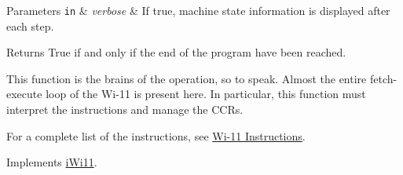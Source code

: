 \begin{DoxyParams}[1]{Parameters}
\mbox{\tt in}  & {\em verbose} & If true, machine state information is displayed after each step. \\
\hline
\end{DoxyParams}
\begin{DoxyReturn}{Returns}
True if and only if the end of the program have been reached.
\end{DoxyReturn}
\begin{DoxyParagraph}{}
This function is the brains of the operation, so to speak. Almost the entire fetch-\/execute loop of the Wi-\/11 is present here. In particular, this function must interpret the instructions and manage the CCRs. 
\end{DoxyParagraph}
\begin{DoxyParagraph}{}
For a complete list of the instructions, see \hyperlink{index_instructions}{Wi-\/11 Instructions}. 
\end{DoxyParagraph}


Implements \hyperlink{classiWi11_ae502d86eb25fe6e1169e800939362074}{iWi11}.

